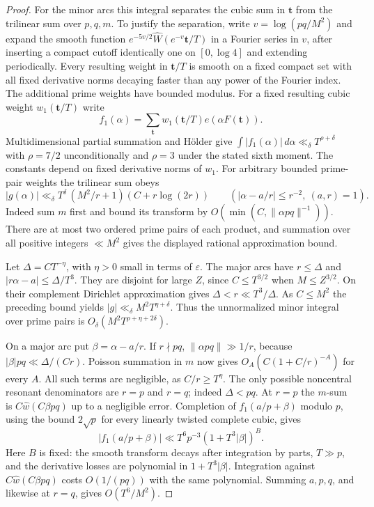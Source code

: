 \documentclass[11pt,letterpaper]{article}
\theoremstyle{definition}
\begin{document}
\begin{proof}
For the minor arcs this integral separates the cubic sum in
$\mathbf t$ from the trilinear sum over $p,q,m$.
To justify the separation, write $v=\log(pq/M^2)$ and expand
the smooth function $e^{-5v/2}\widehat W(e^{-v}\mathbf t/T)$
in a Fourier series in $v$, after inserting a compact cutoff
identically one on $[0,\log 4]$ and extending periodically.
Every resulting weight in $\mathbf t/T$ is smooth on a fixed
compact set with all fixed derivative norms decaying faster than
any power of the Fourier index. The additional prime weights
have bounded modulus. For a fixed resulting cubic weight
$w_1(\mathbf t/T)$ write
\[
 f_1(\alpha)=\sum_{\mathbf t}w_1(\mathbf t/T)e(\alpha F(\mathbf t)).
\]
Multidimensional partial summation and H\"older give
$\int|f_1(\alpha)|\,d\alpha\ll_\delta T^{\rho+\delta}$ with
$\rho=7/2$ unconditionally and $\rho=3$ under the stated sixth
moment. The constants depend on fixed derivative norms of $w_1$.
For arbitrary bounded prime-pair weights the trilinear sum obeys
\[
 |g(\alpha)|\ll_\delta T^\delta\,(M^2/r+1)(C+r\log(2r))
 \qquad (|\alpha-a/r|\le r^{-2},\ (a,r)=1).
\]
Indeed sum $m$ first and bound its transform by
$O(\min(C,\|\alpha pq\|^{-1}))$. There are at most two
ordered prime pairs of each product, and summation over all positive
integers $\ll M^2$ gives the displayed rational approximation bound.

Let $\Delta=C T^{-\eta}$, with $\eta>0$ small in terms of
$\varepsilon$. The major arcs have $r\le\Delta$ and
$|r\alpha-a|\le\Delta/T^3$. They are disjoint for large $Z$,
since $C\le T^{3/2}$ when $M\le Z^{3/2}$.
On their complement Dirichlet approximation gives
$\Delta<r\ll T^3/\Delta$. As $C\le M^2$ the preceding bound
yields $|g|\ll_\delta M^2 T^{\eta+\delta}$.
Thus the unnormalized minor integral over prime pairs is
$O_\delta(M^2 T^{\rho+\eta+2\delta})$.

On a major arc put $\beta=\alpha-a/r$. If $r\nmid pq$,
$\|\alpha pq\|\gg 1/r$, because
$|\beta|pq\ll\Delta/(Cr)$. Poisson summation in $m$ now gives
$O_A(C(1+C/r)^{-A})$ for every $A$. All such terms are negligible,
as $C/r\ge T^\eta$. The only possible noncentral resonant
denominators are $r=p$ and $r=q$; indeed $\Delta<pq$. At $r=p$
the $m$-sum is $C\widehat w(C\beta pq)$ up to a negligible error.
Completion of $f_1(a/p+\beta)$ modulo $p$, using the bound
$2\sqrt p$ for every linearly twisted complete cubic, gives
\[
 |f_1(a/p+\beta)|
     \ll T^6 p^{-3}(1+T^3|\beta|)^B .
\]
Here $B$ is fixed: the smooth transform decays after integration
by parts, $T\gg p$, and the derivative losses are polynomial in
$1+T^3|\beta|$. Integration against $C\widehat w(C\beta pq)$
costs $O(1/(pq))$ with the same polynomial. Summing $a,p,q$,
and likewise at $r=q$, gives $O(T^6/M^2)$.


\end{proof}
\end{document}
